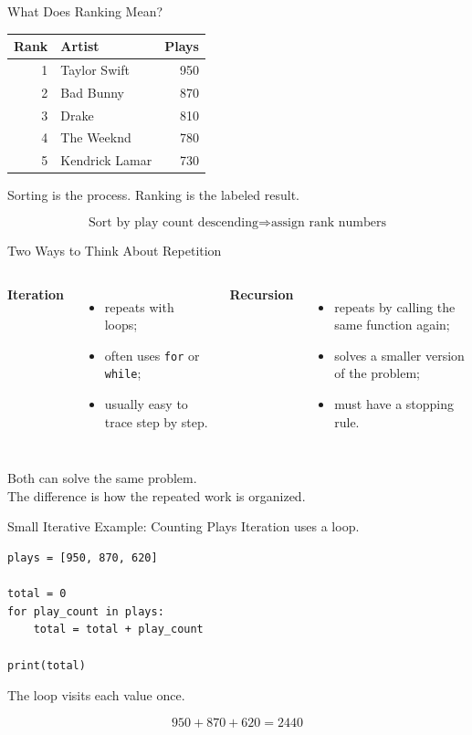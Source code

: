 \documentclass[11pt,aspectratio=43]{beamer}
\begin{document}
\begin{frame}{What Does Ranking Mean?}
  \begin{center}
    \begin{tabular}{r l r}
      \toprule
      Rank & Artist & Plays \\
      \midrule
      1 & Taylor Swift & 950 \\
      2 & Bad Bunny & 870 \\
      3 & Drake & 810 \\
      4 & The Weeknd & 780 \\
      5 & Kendrick Lamar & 730 \\
      \bottomrule
    \end{tabular}
  \end{center}

  \vspace{0.3cm}
  Sorting is the process. Ranking is the labeled result.

  \[
    \text{Sort by play count descending} \Rightarrow \text{assign rank numbers}
  \]
\end{frame}

\begin{frame}{Two Ways to Think About Repetition}
  \begin{columns}
    \textbf{Iteration}
    \begin{itemize}
      \item repeats with loops;
      \item often uses \texttt{for} or \texttt{while};
      \item usually easy to trace step by step.
    \end{itemize}
    \textbf{Recursion}
    \begin{itemize}
      \item repeats by calling the same function again;
      \item solves a smaller version of the problem;
      \item must have a stopping rule.
    \end{itemize}
  \end{columns}

  \vspace{0.5cm}
  Both can solve the same problem.\\
  The difference is how the repeated work is organized.
\end{frame}

\begin{frame}[fragile]{Small Iterative Example: Counting Plays}
  Iteration uses a loop.

  \begin{lstlisting}
plays = [950, 870, 620]

total = 0
for play_count in plays:
    total = total + play_count

print(total)
  \end{lstlisting}

  \vspace{0.3cm}
  The loop visits each value once.

  \[
    950 + 870 + 620 = 2440
  \]
\end{frame}
\end{document}
